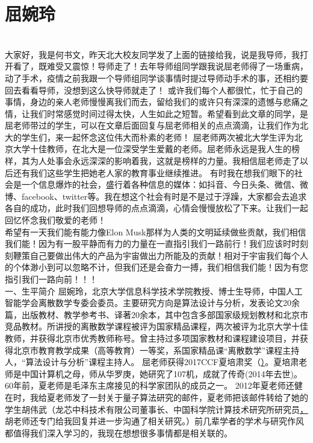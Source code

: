 \documentclass[12pt,twiside,a4paper]{ctexbook}
\numberwithin{chapter}{part}
\begin{document}
\section{屈婉玲}
\href{https://bbs.pku.edu.cn/v2/post-read.php?bid=176&threadid=17762555}\\
大家好，我是何书文，昨天北大校友同学发了上面的链接给我，说是我导师，我打开看了，既难受又震惊！导师走了！去年导师组同学跟我说屈老师得了一场重病，动了手术，疫情之前我跟一个导师组同学谈事情时提过导师动手术的事，还相约要回去看看导师，没想到这么快导师就走了！    或许我们每个人都很忙，忙于自己的事情，身边的亲人老师慢慢离我们而去，留给我们的或许只有深深的遗憾与悲痛之情，让我们时常感觉时间过得太快，人生如此之短暂。希望看到此文章的同学，是屈老师带过的学生，可以在文章后面回复与屈老师相关的点点滴滴，让我们作为北大的学生们，来一起怀念这位伟大而朴素的老师！    屈老师两次被北大学生评为北京大学十佳教师，在北大是一位深受学生爱戴的老师。屈老师永远是我人生的榜样，其为人处事会永远深深的影响着我，这就是榜样的力量。我相信屈老师走了以后还有我们这些学生把她老人家的教育事业继续推进。    有时我在想我们眼下的社会是一个信息爆炸的社会，盛行着各种信息的媒体：如抖音、今日头条、微信、微博、facebook、twitter等。我在想这个社会有时是不是过于浮躁，大家都会去追求各自的成功，此时我们回想导师的点点滴滴，心情会慢慢放松了下来。让我们一起回忆怀念我们敬爱的老师！\\          
希望有一天我们能有能力像Elon Musk那样为人类的文明延续做些贡献，我们相信我们能！因为有一股平静而有力的力量在一直指引我们一路前行！我们应该时时刻刻鞭策自己要做出伟大的产品为宇宙做出力所能及的贡献！相对于宇宙我们每个人的个体渺小到可以忽略不计，但我们还是会奋力一搏，我们相信我们能！因为有您指引我们一路向前！！！\\
一、生平简介    屈婉玲，北京大学信息科学技术学院教授、博士生导师，中国人工智能学会离散数学专委会委员。主要研究方向是算法设计与分析，发表论文20余篇，出版教材、教学参考书、译著20余本，其中包含多部国家级规划教材和北京市竞品教材。所讲授的离散数学课程被评为国家精品课程，两次被评为北京大学十佳教师，并获得北京市优秀教师称号。曾主持过多项国家教材和课程建设项目，并获得北京市教育教学成果（高等教育）一等奖，系国家精品课“离散数学”课程主持人，“算法设计与分析”课程主持人。    屈老师获得2017CCF夏培肃奖（\href{https://www.ccf.org.cn/c/2018-02-05/622953.shtml}）。夏培肃老师是中国计算机之母，师从华罗庚，她研究了107机，成就了传奇(2014年去世\href{http://www.cas.cn/xw/yxdt/201408/t20140827_4193177.shtml})。60年前，夏老师是毛泽东主席接见的科学家团队的成员之一。 2012年夏老师还健在时，我给夏老师发了一封关于量子算法研究的邮件，夏老师把该邮件转给了她的学生胡伟武（龙芯中科技术有限公司董事长、中国科学院计算技术研究所研究员\href{https://iat.ustc.edu.cn/Practical-tutor/2318.html}，胡老师还专门给我回复并进一步沟通了相关研究。）前几辈学者的学术与研究作风都值得我们深入学习的，我现在想想很多事情都是相关联的。\\
\end{document}
